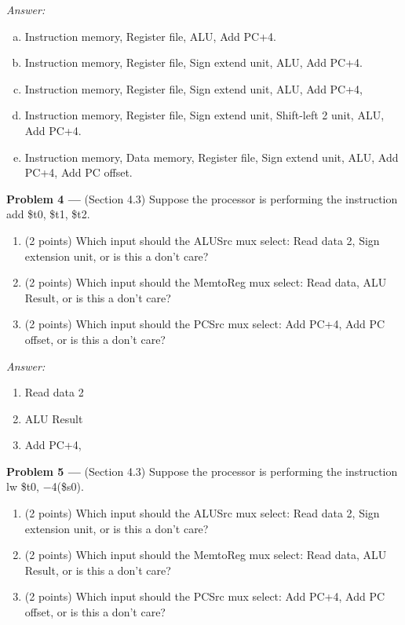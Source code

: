 \documentclass[11pt]{article}
\newcommand{\problem}[1]{\textbf{Problem #1 ---} }
\newcommand{\answer}{{\color{red}\textit{Answer: }}}
\begin{document}
\answer
\begin{enumerate}[(a)]
    \item Instruction memory, Register file, ALU, Add PC+4.
    \item Instruction memory, Register file, Sign extend unit, ALU, Add PC+4.  
    \item Instruction memory, Register file, Sign extend unit, ALU, Add PC+4,
    \item Instruction memory, Register file, Sign extend unit, Shift-left 2 unit, ALU, Add PC+4.
    \item Instruction memory, Data memory, Register file,  Sign extend unit, ALU, Add PC+4, Add PC offset. 
\end{enumerate}
\newpage

\problem{4}(Section 4.3) Suppose the processor is performing the instruction \textsf{add \$t0, \$t1, \$t2}.
\begin{enumerate}
    \item(2 points) Which input should the \textsf{ALUSrc} mux select: Read data 2, Sign extension unit, or is this a don't care?
    \item(2 points) Which input should the \textsf{MemtoReg} mux select:  Read data, ALU Result, or is this a don't care?
    \item(2 points) Which input should the \textsf{PCSrc} mux select: Add PC+4, Add PC offset, or is this a don't care?
\end{enumerate}

\answer
\begin{enumerate}[(1)]
    \item Read data 2
    \item ALU Result
    \item Add PC+4,
\end{enumerate}

\problem{5}(Section 4.3) Suppose the processor is performing the instruction \textsf{lw \$t0, $-$4(\$s0)}.
\begin{enumerate}
    \item(2 points) Which input should the \textsf{ALUSrc} mux select: Read data 2, Sign extension unit, or is this a don't care?
    \item(2 points) Which input should the \textsf{MemtoReg} mux select:  Read data, ALU Result, or is this a don't care?
    \item(2 points) Which input should the \textsf{PCSrc} mux select: Add PC+4, Add PC offset, or is this a don't care?
\end{enumerate}
\end{document}
